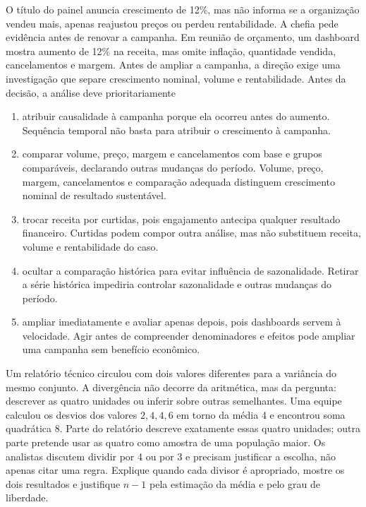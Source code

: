 O título do painel anuncia crescimento de 12\%, mas não informa se a organização vendeu mais, apenas reajustou preços ou perdeu rentabilidade. A chefia pede evidência antes de renovar a campanha.
 Em reunião de orçamento, um dashboard mostra aumento de 12\% na receita, mas omite inflação, quantidade vendida, cancelamentos e margem. Antes de ampliar a campanha, a direção exige uma investigação que separe crescimento nominal, volume e rentabilidade.
\FonteDidatica
\Comando Antes da decisão, a análise deve prioritariamente
\begin{enumerate}[label=\Alph*)]
  \item atribuir causalidade à campanha porque ela ocorreu antes do aumento. Sequência temporal não basta para atribuir o crescimento à campanha.
  \item comparar volume, preço, margem e cancelamentos com base e grupos comparáveis, declarando outras mudanças do período. Volume, preço, margem, cancelamentos e comparação adequada distinguem crescimento nominal de resultado sustentável.
  \item trocar receita por curtidas, pois engajamento antecipa qualquer resultado financeiro. Curtidas podem compor outra análise, mas não substituem receita, volume e rentabilidade do caso.
  \item ocultar a comparação histórica para evitar influência de sazonalidade. Retirar a série histórica impediria controlar sazonalidade e outras mudanças do período.
  \item ampliar imediatamente e avaliar apenas depois, pois dashboards servem à velocidade. Agir antes de compreender denominadores e efeitos pode ampliar uma campanha sem benefício econômico.
\end{enumerate}

\TextoBase

Um relatório técnico circulou com dois valores diferentes para a variância do mesmo conjunto. A divergência não decorre da aritmética, mas da pergunta: descrever as quatro unidades ou inferir sobre outras semelhantes.
 Uma equipe calculou os desvios dos valores $2,4,4,6$ em torno da média 4 e encontrou soma quadrática 8. Parte do relatório descreve exatamente essas quatro unidades; outra parte pretende usar as quatro como amostra de uma população maior. Os analistas discutem dividir por 4 ou por 3 e precisam justificar a escolha, não apenas citar uma regra.
\FonteDidatica
\Comando Explique quando cada divisor é apropriado, mostre os dois resultados e justifique $n-1$ pela estimação da média e pelo grau de liberdade.


